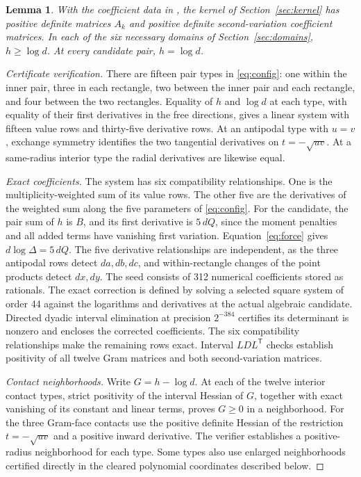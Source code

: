 \documentclass[11pt]{article}
\newtheorem{lemma}{Lemma}
\begin{document}
\begin{lemma}\label{lem:verification}
With the coefficient data in \cite{data}, the kernel of
Section~\ref{sec:kernel} has positive definite matrices \(A_k\) and
positive definite second-variation coefficient matrices. In each
of the six necessary domains of Section~\ref{sec:domains},
\(h\ge\log d\). At every candidate pair, \(h=\log d\).
\end{lemma}

\begin{proof}[Certificate verification]
There are fifteen pair types in \eqref{eq:config}: one within the
inner pair, three in each rectangle, two between the inner pair
and each rectangle, and four between the two rectangles.
Equality of \(h\) and \(\log d\) at each type, with equality
of their first derivatives in the free directions, gives a
linear system with fifteen value rows and thirty-five derivative
rows. At an antipodal type with \(u=v\), exchange symmetry
identifies the two tangential derivatives on \(t=-\sqrt{uv}\).
At a same-radius interior type the radial derivatives are likewise
equal.

\emph{Exact coefficients.}
The system has six compatibility relationships. One is the
multiplicity-weighted sum of its value rows. The other five are
the derivatives of the weighted sum along the five parameters
of \eqref{eq:config}. For the candidate, the pair sum of \(h\)
is \(B\), and its first derivative is \(5\,dQ\), since the
moment penalties and all added terms have vanishing first
variation. Equation~\eqref{eq:force} gives \(d\log\Delta=5\,dQ\).
The five derivative relationships are independent, as the three
antipodal rows detect \(da,db,dc\), and within-rectangle changes
of the point products detect \(dx,dy\).
The seed consists of 312 numerical coefficients stored as rationals.
The exact correction is defined by solving a selected square
system of order 44 against the logarithms and derivatives at the
actual algebraic candidate. Directed dyadic interval elimination
at precision \(2^{-384}\) certifies its determinant is nonzero and
encloses the corrected coefficients. The six compatibility
relationships make the remaining rows exact. Interval \(LDL^{\mathsf T}\)
checks establish positivity of all twelve Gram matrices and both
second-variation matrices.

\emph{Contact neighborhoods.}
Write \(G=h-\log d\). At each of the twelve interior contact types,
strict positivity of the interval Hessian of \(G\), together with
exact vanishing of its constant and linear terms, proves \(G\ge0\)
in a neighborhood. For the three Gram-face contacts use the
positive definite Hessian of the restriction \(t=-\sqrt{uv}\)
and a positive inward derivative. The verifier establishes a
positive-radius neighborhood for each type.
Some types also use enlarged neighborhoods certified directly in
the cleared polynomial coordinates described below.


\end{proof}
\end{document}
